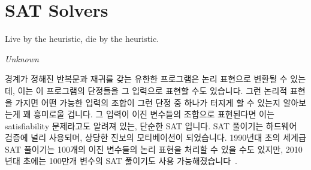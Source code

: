 
\section{SAT Solvers}
\label{sec:formal:SAT Solvers}
%
\epigraph{Live by the heuristic, die by the heuristic.}{\emph{Unknown}}

경계가 정해진 반복문과 재귀를 갖는 유한한 프로그램은 논리 표현으로 변환될 수
있는데, 이는 이 프로그램의 단정들을 그 입력으로 표현할 수도 있습니다.
그런 논리적 표현을 가지면 어떤 가능한 입력의 조합이 그런 단정 중 하나가 터지게
할 수 있는지 알아보는게 꽤 흥미로울 겁니다.
그 입력이 이진 변수들의 조합으로 표현된다면 이는 satisfiability 문제라고도
알려져 있는, 단순한 SAT 입니다.
SAT 풀이기는 하드웨어 검증에 널리 사용되며, 상당한 진보의 모티베이션이
되었습니다.
1990년대 초의 세계급 SAT 풀이기는 100개의 이진 변수들의 논리 표현을 처리할 수
있을 수도 있지만, 2010년대 초에는 100만개 변수의 SAT 풀이기도 사용
가능해졌습니다~\cite{Kroening:2008:DPA:1391237}.

